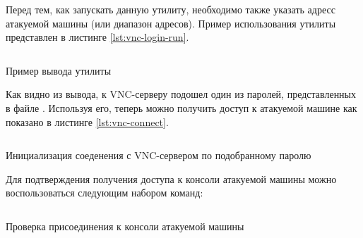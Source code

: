 Перед тем, как запускать данную утилиту, необходимо также указать адресс атакуемой машины (или диапазон адресов). Пример использования
утилиты  представлен в листинге \ref{lst:vnc-login-run}.

\begin{listing}[H]
    \inputminted{console}{resources/vnc/03_login_run}
    \caption{Пример вывода утилиты }
    \label{lst:vnc-login-run}
\end{listing}

Как видно из вывода, к VNC-серверу подошел один из паролей, представленных в файле . Используя его, теперь можно получить
доступ к атакуемой машине как показано в листинге \ref{lst:vnc-connect}.

\begin{listing}[H]
    \inputminted{console}{resources/vnc/04_vnc_connect}
    \caption{Инициализация соеденения с VNC-сервером по подобранному паролю}
    \label{lst:vnc-connect}
\end{listing}

Для подтверждения получения доступа к консоли атакуемой машины можно воспользоваться следующим набором команд:

\begin{listing}[H]
    \inputminted{console}{resources/vnc/05_vnc_test}
    \caption{Проверка присоединения к консоли атакуемой машины}
\end{listing}
